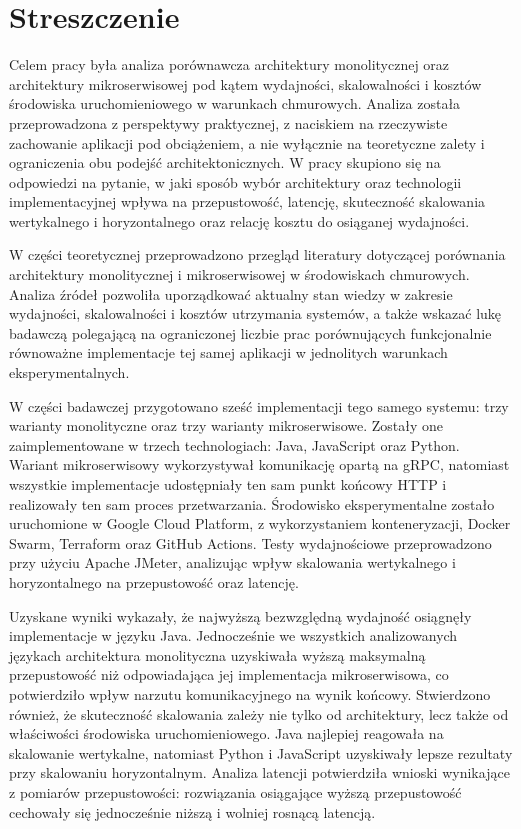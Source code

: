 \section*{Streszczenie}

Celem pracy była analiza porównawcza architektury monolitycznej oraz architektury mikroserwisowej pod kątem wydajności, skalowalności i kosztów środowiska uruchomieniowego w warunkach chmurowych. Analiza została przeprowadzona z perspektywy praktycznej, z naciskiem na rzeczywiste zachowanie aplikacji pod obciążeniem, a nie wyłącznie na teoretyczne zalety i ograniczenia obu podejść architektonicznych. W pracy skupiono się na odpowiedzi na pytanie, w jaki sposób wybór architektury oraz technologii implementacyjnej wpływa na przepustowość, latencję, skuteczność skalowania wertykalnego i horyzontalnego oraz relację kosztu do osiąganej wydajności.

W części teoretycznej przeprowadzono przegląd literatury dotyczącej porównania architektury monolitycznej i mikroserwisowej w środowiskach chmurowych. Analiza źródeł pozwoliła uporządkować aktualny stan wiedzy w zakresie wydajności, skalowalności i kosztów utrzymania systemów, a także wskazać lukę badawczą polegającą na ograniczonej liczbie prac porównujących funkcjonalnie równoważne implementacje tej samej aplikacji w jednolitych warunkach eksperymentalnych.

W części badawczej przygotowano sześć implementacji tego samego systemu: trzy warianty monolityczne oraz trzy warianty mikroserwisowe. Zostały one zaimplementowane w trzech technologiach: Java, JavaScript oraz Python. Wariant mikroserwisowy wykorzystywał komunikację opartą na gRPC, natomiast wszystkie implementacje udostępniały ten sam punkt końcowy HTTP i realizowały ten sam proces przetwarzania. Środowisko eksperymentalne zostało uruchomione w Google Cloud Platform, z wykorzystaniem konteneryzacji, Docker Swarm, Terraform oraz GitHub Actions. Testy wydajnościowe przeprowadzono przy użyciu Apache JMeter, analizując wpływ skalowania wertykalnego i horyzontalnego na przepustowość oraz latencję.

Uzyskane wyniki wykazały, że najwyższą bezwzględną wydajność osiągnęły implementacje w języku Java. Jednocześnie we wszystkich analizowanych językach architektura monolityczna uzyskiwała wyższą maksymalną przepustowość niż odpowiadająca jej implementacja mikroserwisowa, co potwierdziło wpływ narzutu komunikacyjnego na wynik końcowy. Stwierdzono również, że skuteczność skalowania zależy nie tylko od architektury, lecz także od właściwości środowiska uruchomieniowego. Java najlepiej reagowała na skalowanie wertykalne, natomiast Python i JavaScript uzyskiwały lepsze rezultaty przy skalowaniu horyzontalnym. Analiza latencji potwierdziła wnioski wynikające z pomiarów przepustowości: rozwiązania osiągające wyższą przepustowość cechowały się jednocześnie niższą i wolniej rosnącą latencją.

